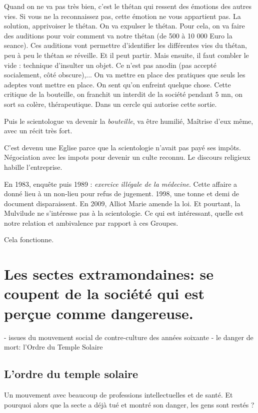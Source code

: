 Quand on ne va pas très bien, c'est le thétan qui ressent des émotions des autres vies. Si vous ne la reconnaissez pas, cette émotion ne vous appartient pas. 
La solution, apprivoiser le thétan. On va expulser le thétan. Pour cela, on va faire des auditions pour voir comment va notre thétan (de 500 à 10 000 Euro la seance). Ces auditions vont permettre d'identifier les différentes vies du thétan, peu à peu le thétan se réveille. Et il peut partir.
Mais ensuite, il faut combler le vide : technique d'insulter un objet. Ce n'est pas anodin (pas accepté socialement, côté obscure),... On va mettre en place des pratiques que seuls les adeptes vont mettre en place. On sent qu'on enfreint quelque chose. Cette critique de la bouteille, on franchit un interdit de la société pendant 5 mn, on sort sa colère, thérapeutique. Dans un cercle qui autorise cette sortie.  

Puis le scientologue va devenir la \textit{bouteille}, va être humilié, Maîtrise d'eux même, avec un récit très fort. 

C'est devenu une Eglise parce que la scientologie n'avait pas payé ses impôts. Négociation avec les impots pour devenir un culte reconnu. Le discours religieux habille l'entreprise. 

En 1983, enquête puis 1989 : \textit{exercice illégale de la médecine}. Cette affaire a donné lieu à un non-lieu pour refus de jugement. 
1998, une tonne et demi de document disparaissent.
En 2009, Alliot Marie amende la loi.
Et pourtant, la Mulvilude ne s'intéresse pas à la scientologie. Ce qui est intéressant, quelle est notre relation et ambivalence par rapport à ces Groupes. 

Cela fonctionne. 







\section{Les sectes extramondaines: se coupent de la société qui est perçue comme dangereuse.}

- issues du mouvement social de contre-culture des années soixante
- le danger de mort: l'Ordre du Temple Solaire

\subsection{L'ordre du temple solaire}
Un mouvement avec beaucoup de professions intellectuelles et de santé. Et pourquoi alors que la secte a déjà tué et montré son danger, les gens sont restés ?

